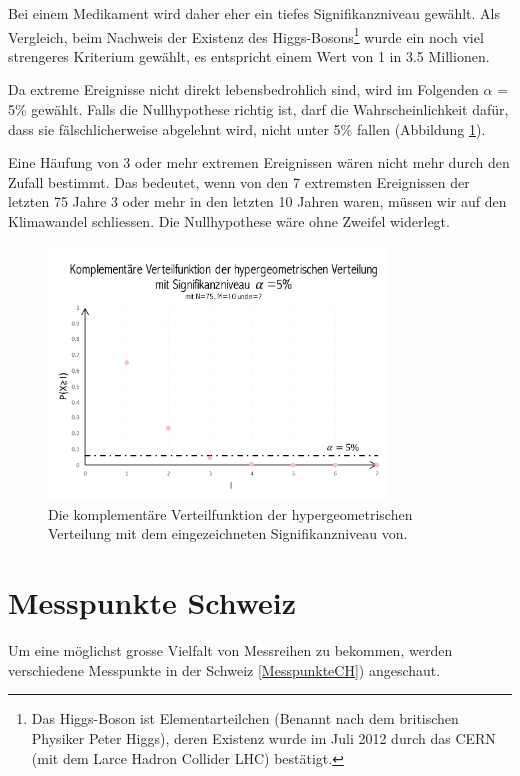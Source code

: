 \begin{refsection}
Bei einem Medikament wird daher eher ein tiefes Signifikanzniveau gewählt. Als Vergleich, beim Nachweis der Existenz des Higgs-Bosons\footnote{%
Das Higgs-Boson ist Elementarteilchen (Benannt nach dem britischen Physiker Peter Higgs), deren Existenz wurde im Juli 2012 durch das CERN (mit dem Larce Hadron Collider LHC) bestätigt.} wurde ein noch viel strengeres Kriterium gewählt, es entspricht einem Wert von 1 in 3.5 Millionen. 

Da extreme Ereignisse nicht direkt lebensbedrohlich sind, wird im Folgenden $\alpha$ = 5\% gewählt.
Falls die Nullhypothese richtig ist, darf die Wahrscheinlichkeit dafür, dass sie fälschlicherweise abgelehnt wird, nicht unter 5\% fallen (Abbildung \ref{SigniAlpha}).


Eine Häufung von 3 oder mehr extremen Ereignissen wären nicht mehr durch den Zufall bestimmt. Das bedeutet, wenn von den 7 extremsten Ereignissen der letzten 75 Jahre 3 oder mehr in den letzten 10 Jahren waren, müssen wir auf den Klimawandel schliessen. Die Nullhypothese wäre ohne Zweifel widerlegt.

\begin{figure}
\centering
\includegraphics[width=0.8\textwidth]{extrem/SigniAlpha.pdf}
\caption{Die komplementäre Verteilfunktion der hypergeometrischen Verteilung mit dem eingezeichneten Signifikanzniveau von.}
\label{SigniAlpha}
\end{figure}


\section{Messpunkte Schweiz} \label{MesspunkteSchweiz}
Um eine möglichst grosse Vielfalt von Messreihen zu bekommen, werden verschiedene Messpunkte in der Schweiz \ref{MesspunkteCH}) angeschaut. 


\end{refsection}
